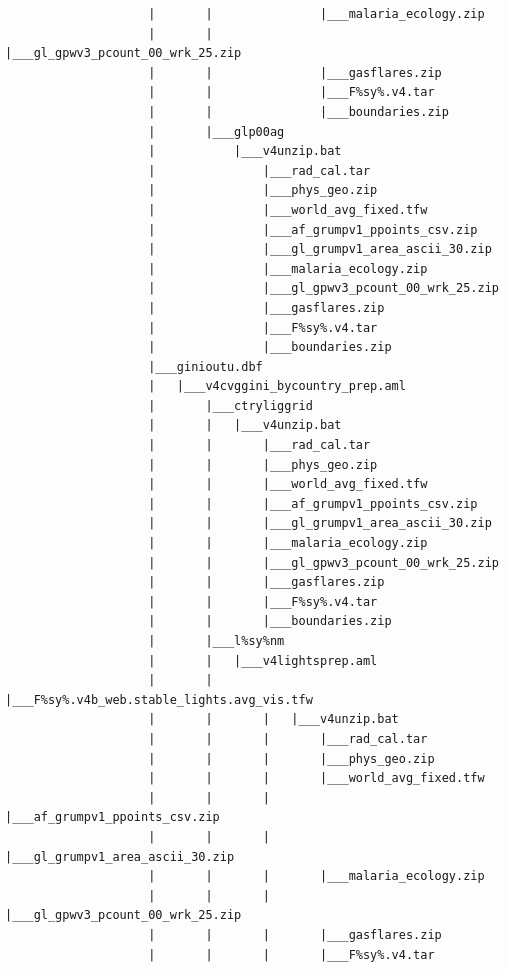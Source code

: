 \documentclass[
]{book}
\begin{document}
\begin{verbatim}
                    |       |               |___malaria_ecology.zip
                    |       |               |___gl_gpwv3_pcount_00_wrk_25.zip
                    |       |               |___gasflares.zip
                    |       |               |___F%sy%.v4.tar
                    |       |               |___boundaries.zip
                    |       |___glp00ag
                    |           |___v4unzip.bat
                    |               |___rad_cal.tar
                    |               |___phys_geo.zip
                    |               |___world_avg_fixed.tfw
                    |               |___af_grumpv1_ppoints_csv.zip
                    |               |___gl_grumpv1_area_ascii_30.zip
                    |               |___malaria_ecology.zip
                    |               |___gl_gpwv3_pcount_00_wrk_25.zip
                    |               |___gasflares.zip
                    |               |___F%sy%.v4.tar
                    |               |___boundaries.zip
                    |___ginioutu.dbf
                    |   |___v4cvggini_bycountry_prep.aml
                    |       |___ctryliggrid
                    |       |   |___v4unzip.bat
                    |       |       |___rad_cal.tar
                    |       |       |___phys_geo.zip
                    |       |       |___world_avg_fixed.tfw
                    |       |       |___af_grumpv1_ppoints_csv.zip
                    |       |       |___gl_grumpv1_area_ascii_30.zip
                    |       |       |___malaria_ecology.zip
                    |       |       |___gl_gpwv3_pcount_00_wrk_25.zip
                    |       |       |___gasflares.zip
                    |       |       |___F%sy%.v4.tar
                    |       |       |___boundaries.zip
                    |       |___l%sy%nm
                    |       |   |___v4lightsprep.aml
                    |       |       |___F%sy%.v4b_web.stable_lights.avg_vis.tfw
                    |       |       |   |___v4unzip.bat
                    |       |       |       |___rad_cal.tar
                    |       |       |       |___phys_geo.zip
                    |       |       |       |___world_avg_fixed.tfw
                    |       |       |       |___af_grumpv1_ppoints_csv.zip
                    |       |       |       |___gl_grumpv1_area_ascii_30.zip
                    |       |       |       |___malaria_ecology.zip
                    |       |       |       |___gl_gpwv3_pcount_00_wrk_25.zip
                    |       |       |       |___gasflares.zip
                    |       |       |       |___F%sy%.v4.tar

\end{verbatim}
\end{document}
